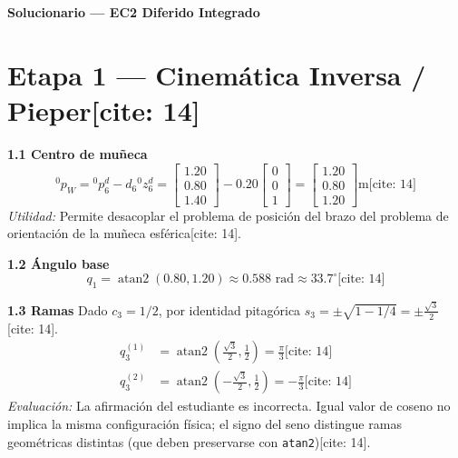 \documentclass[11pt, a4paper]{article}
\begin{document}
\begin{center}
    \Large\textbf{\textcolor{red!80!black}{Solucionario — EC2 Diferido Integrado}}\\[0.2cm]
\end{center}

\section*{Etapa 1 — Cinemática Inversa / Pieper[cite: 14]}

\textbf{1.1 Centro de muñeca}
\begin{equation*}
    {}^0p_W = {}^0p_6^d - d_6{}^0z_6^d = \begin{bmatrix} 1.20 \\ 0.80 \\ 1.40 \end{bmatrix} - 0.20 \begin{bmatrix} 0 \\ 0 \\ 1 \end{bmatrix} = \boxed{ \begin{bmatrix} 1.20 \\ 0.80 \\ 1.20 \end{bmatrix}\text{m} } \text{[cite: 14]}
\end{equation*}
\textit{Utilidad:} Permite desacoplar el problema de posición del brazo del problema de orientación de la muñeca esférica[cite: 14].

\textbf{1.2 Ángulo base}
\begin{equation*}
    q_1 = \operatorname{atan2}(0.80, 1.20) \approx \boxed{ 0.588 \text{ rad} \approx 33.7^\circ } \text{[cite: 14]}
\end{equation*}

\textbf{1.3 Ramas}
Dado $c_3 = 1/2$, por identidad pitagórica $s_3 = \pm\sqrt{1 - 1/4} = \pm\frac{\sqrt{3}}{2}$[cite: 14].
\begin{align*}
    q_3^{(1)} &= \operatorname{atan2}\left( \frac{\sqrt{3}}{2}, \frac{1}{2} \right) = \boxed{ \frac{\pi}{3} } \text{[cite: 14]}\\
    q_3^{(2)} &= \operatorname{atan2}\left( -\frac{\sqrt{3}}{2}, \frac{1}{2} \right) = \boxed{ -\frac{\pi}{3} } \text{[cite: 14]}
\end{align*}
\textit{Evaluación:} La afirmación del estudiante es incorrecta. Igual valor de coseno no implica la misma configuración física; el signo del seno distingue ramas geométricas distintas (que deben preservarse con \texttt{atan2})[cite: 14].
\end{document}
